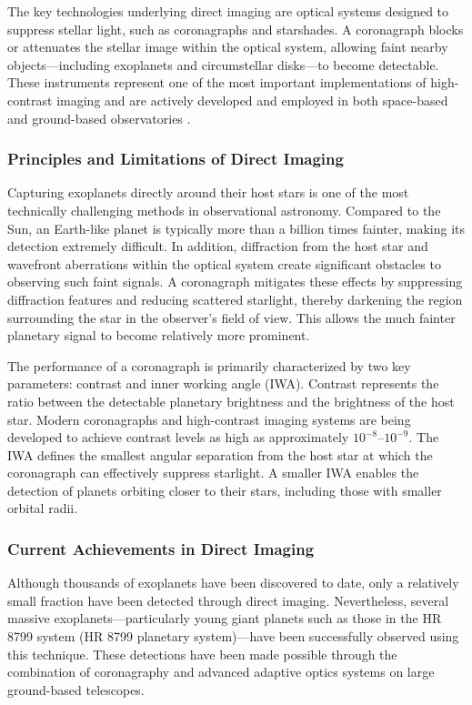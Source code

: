 The key technologies underlying direct imaging are optical systems designed to suppress stellar light, such as coronagraphs and starshades. A coronagraph blocks or attenuates the stellar image within the optical system, allowing faint nearby objects---including exoplanets and circumstellar disks---to become detectable. These instruments represent one of the most important implementations of high-contrast imaging and are actively developed and employed in both space-based and ground-based observatories \cite{galicher2023}.

\subsubsection{Principles and Limitations of Direct Imaging}

Capturing exoplanets directly around their host stars is one of the most technically challenging methods in observational astronomy. Compared to the Sun, an Earth-like planet is typically more than a billion times fainter, making its detection extremely difficult. In addition, diffraction from the host star and wavefront aberrations within the optical system create significant obstacles to observing such faint signals. A coronagraph mitigates these effects by suppressing diffraction features and reducing scattered starlight, thereby darkening the region surrounding the star in the observer's field of view. This allows the much fainter planetary signal to become relatively more prominent.

The performance of a coronagraph is primarily characterized by two key parameters: contrast and inner working angle (IWA). Contrast represents the ratio between the detectable planetary brightness and the brightness of the host star. Modern coronagraphs and high-contrast imaging systems are being developed to achieve contrast levels as high as approximately $10^{-8}$--$10^{-9}$. The IWA defines the smallest angular separation from the host star at which the coronagraph can effectively suppress starlight. A smaller IWA enables the detection of planets orbiting closer to their stars, including those with smaller orbital radii.

\subsubsection{Current Achievements in Direct Imaging}

Although thousands of exoplanets have been discovered to date, only a relatively small fraction have been detected through direct imaging. Nevertheless, several massive exoplanets---particularly young giant planets such as those in the HR 8799 system (HR 8799 planetary system)---have been successfully observed using this technique. These detections have been made possible through the combination of coronagraphy and advanced adaptive optics systems on large ground-based telescopes.

